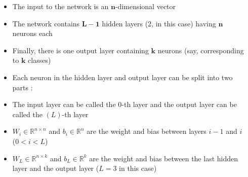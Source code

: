 \savestack{\nn}{}

\begin{frame}
\end{frame}

\begin{frame}
  \begin{columns}
    \begin{overlayarea}{\textwidth}{\textheight}
      
    \end{overlayarea}

    \begin{overlayarea}{\textwidth}{\textheight}
      \begin{itemize}
        \item<1-> The input to the network is an $\mathbf{n}$-dimensional vector
        \item<3-> The network contains $\mathbf{L-1}$ hidden layers (2, in this case) having $\mathbf{n}$ neurons each
        \item<5-> Finally, there is one output layer containing $\mathbf{k}$ neurons (say, corresponding to $\mathbf{k}$ classes)
        \item<7-> Each neuron in the hidden layer and output layer can be split into two parts :   
        \item<12-> The input layer can be called the $0$-th layer and the output layer can be called the $(L)$-th layer
        \item<13-> $W_i \in \mathbb{R}^{n\times n}$ and $b_i \in \mathbb{R}^n$ are the weight and bias between layers $i-1$ and $i$  ($0<i<L$)
        \item<15-> $W_{L} \in \mathbb{R}^{n\times k}$ and $b_{L} \in \mathbb{R}^k$ are the weight and bias between the last hidden layer and the output layer ($L = 3$ in this case)
      \end{itemize}
    \end{overlayarea}
  \end{columns}
\end{frame}

